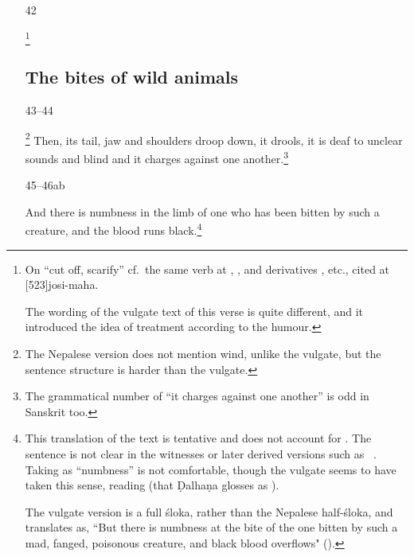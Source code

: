 \begin{translation}
\begin{itemize}
\item[42]

\footnote{On  “cut off, scarify” cf.\ the same
    verb at , , and derivatives
    , etc., cited at
    [523]{josi-maha}.

The wording of the vulgate text of this verse is quite different, and it
introduced the idea of treatment according to the humour.}

\subsection{The bites of wild animals}
\label{rabies}

\item[43--44]

\footnote{The Nepalese
    version does not mention wind, unlike the vulgate, but the sentence
    structure is harder than the vulgate.}  Then, its tail, jaw and
    shoulders droop down, it drools, it is deaf to unclear sounds and
    blind and it charges against one another.\footnote{The grammatical 
    number of “it charges against one another” is odd in Sanskrit too.}
    
\item[45--46ab]

And there is numbness in the limb of one who has been bitten by such
a creature, and the blood runs black.\footnote{This translation of
    the text is tentative and does not account for .  The
    sentence is not clear in the witnesses or later derived versions such
    as \AH\ .  Taking  as “numbness” is not
    comfortable, though the vulgate seems to have taken this sense, reading 
     (that Ḍalhaṇa glosses as ).
    
The vulgate version is a full śloka, rather than the Nepalese
half-śloka, and translates as, “But there is numbness at the bite of
the one bitten by such a mad, fanged, poisonous creature, and black
blood overflows" ().
    
}
\end{itemize}
\end{translation}
